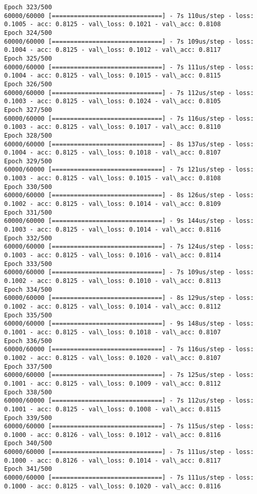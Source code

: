 \documentclass[11pt]{article}
\begin{document}
\begin{Verbatim}[commandchars=\\\{\}]
Epoch 323/500
60000/60000 [==============================] - 7s 110us/step - loss: 0.1005 - acc: 0.8125 - val\_loss: 0.1021 - val\_acc: 0.8108
Epoch 324/500
60000/60000 [==============================] - 7s 109us/step - loss: 0.1004 - acc: 0.8125 - val\_loss: 0.1012 - val\_acc: 0.8117
Epoch 325/500
60000/60000 [==============================] - 7s 111us/step - loss: 0.1004 - acc: 0.8125 - val\_loss: 0.1015 - val\_acc: 0.8115
Epoch 326/500
60000/60000 [==============================] - 7s 112us/step - loss: 0.1003 - acc: 0.8125 - val\_loss: 0.1024 - val\_acc: 0.8105
Epoch 327/500
60000/60000 [==============================] - 7s 116us/step - loss: 0.1003 - acc: 0.8125 - val\_loss: 0.1017 - val\_acc: 0.8110
Epoch 328/500
60000/60000 [==============================] - 8s 137us/step - loss: 0.1004 - acc: 0.8125 - val\_loss: 0.1018 - val\_acc: 0.8107
Epoch 329/500
60000/60000 [==============================] - 7s 121us/step - loss: 0.1003 - acc: 0.8125 - val\_loss: 0.1015 - val\_acc: 0.8108
Epoch 330/500
60000/60000 [==============================] - 8s 126us/step - loss: 0.1002 - acc: 0.8125 - val\_loss: 0.1014 - val\_acc: 0.8109
Epoch 331/500
60000/60000 [==============================] - 9s 144us/step - loss: 0.1003 - acc: 0.8125 - val\_loss: 0.1014 - val\_acc: 0.8116
Epoch 332/500
60000/60000 [==============================] - 7s 124us/step - loss: 0.1003 - acc: 0.8125 - val\_loss: 0.1016 - val\_acc: 0.8114
Epoch 333/500
60000/60000 [==============================] - 7s 109us/step - loss: 0.1002 - acc: 0.8125 - val\_loss: 0.1010 - val\_acc: 0.8113
Epoch 334/500
60000/60000 [==============================] - 8s 129us/step - loss: 0.1002 - acc: 0.8125 - val\_loss: 0.1014 - val\_acc: 0.8112
Epoch 335/500
60000/60000 [==============================] - 9s 148us/step - loss: 0.1001 - acc: 0.8125 - val\_loss: 0.1018 - val\_acc: 0.8107
Epoch 336/500
60000/60000 [==============================] - 7s 116us/step - loss: 0.1002 - acc: 0.8125 - val\_loss: 0.1020 - val\_acc: 0.8107
Epoch 337/500
60000/60000 [==============================] - 7s 125us/step - loss: 0.1001 - acc: 0.8125 - val\_loss: 0.1009 - val\_acc: 0.8112
Epoch 338/500
60000/60000 [==============================] - 7s 112us/step - loss: 0.1001 - acc: 0.8125 - val\_loss: 0.1008 - val\_acc: 0.8115
Epoch 339/500
60000/60000 [==============================] - 7s 115us/step - loss: 0.1000 - acc: 0.8126 - val\_loss: 0.1012 - val\_acc: 0.8116
Epoch 340/500
60000/60000 [==============================] - 7s 111us/step - loss: 0.1000 - acc: 0.8126 - val\_loss: 0.1014 - val\_acc: 0.8117
Epoch 341/500
60000/60000 [==============================] - 7s 111us/step - loss: 0.1000 - acc: 0.8125 - val\_loss: 0.1020 - val\_acc: 0.8116

\end{Verbatim}
\end{document}

